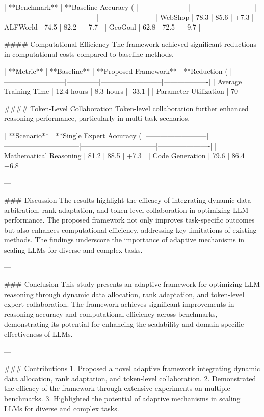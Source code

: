 | **Benchmark**      | **Baseline Accuracy (%
|---------------------|---------------------------|---------------------------------------|----------------------|  
| WebShop            | 78.3                      | 85.6                                 | +7.3                |  
| ALFWorld           | 74.5                      | 82.2                                 | +7.7                |  
| GeoGoal            | 62.8                      | 72.5                                 | +9.7                |  

#### Computational Efficiency  
The framework achieved significant reductions in computational costs compared to baseline methods.

| **Metric**              | **Baseline** | **Proposed Framework** | **Reduction (%
|--------------------------|--------------|--------------------------|-------------------|  
| Average Training Time   | 12.4 hours   | 8.3 hours               | -33.1            |  
| Parameter Utilization   | 70%

#### Token-Level Collaboration  
Token-level collaboration further enhanced reasoning performance, particularly in multi-task scenarios.

| **Scenario**            | **Single Expert Accuracy (%
|--------------------------|--------------------------------|--------------------------------|----------------------|  
| Mathematical Reasoning  | 81.2                          | 88.5                          | +7.3                |  
| Code Generation         | 79.6                          | 86.4                          | +6.8                |  

---

### Discussion  
The results highlight the efficacy of integrating dynamic data arbitration, rank adaptation, and token-level collaboration in optimizing LLM performance. The proposed framework not only improves task-specific outcomes but also enhances computational efficiency, addressing key limitations of existing methods. The findings underscore the importance of adaptive mechanisms in scaling LLMs for diverse and complex tasks.

---

### Conclusion  
This study presents an adaptive framework for optimizing LLM reasoning through dynamic data allocation, rank adaptation, and token-level expert collaboration. The framework achieves significant improvements in reasoning accuracy and computational efficiency across benchmarks, demonstrating its potential for enhancing the scalability and domain-specific effectiveness of LLMs.

---

### Contributions  
1. Proposed a novel adaptive framework integrating dynamic data allocation, rank adaptation, and token-level collaboration.  
2. Demonstrated the efficacy of the framework through extensive experiments on multiple benchmarks.  
3. Highlighted the potential of adaptive mechanisms in scaling LLMs for diverse and complex tasks.  